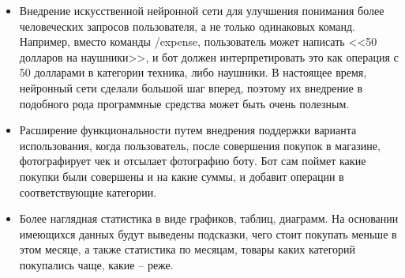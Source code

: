 \begin{itemize}
	\item Внедрение искусственной нейронной сети \cite{networks} для улучшения понимания более человеческих запросов пользователя, а не только одинаковых команд. Например, вместо команды /expense, пользователь может написать <<50 долларов на наушники>>, и бот должен интерпретировать это как операция с 50 долларами в категории техника, либо наушники. В настоящее время, нейронный сети сделали большой шаг вперед, поэтому их внедрение в подобного рода программные средства может быть очень полезным.
	\item Расширение функциональности путем внедрения поддержки варианта использования, когда пользователь, после совершения покупок в магазине, фотографирует чек и отсылает фотографию боту. Бот сам поймет какие покупки были совершены и на какие суммы, и добавит операции в соответствующие категории.
	\item Более наглядная статистика в виде графиков, таблиц, диаграмм. На основании имеющихся данных будут выведены подсказки, чего стоит покупать меньше в этом месяце, а также статистика по месяцам, товары каких категорий покупались чаще, какие – реже.
\end{itemize}
